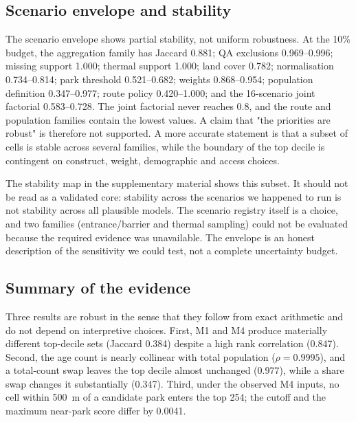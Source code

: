 \documentclass[times,twoside]{_Templates/MultiTargetManuscript}
\begin{document}


\subsection{Scenario envelope and stability}

The scenario envelope shows partial stability, not uniform robustness. At the
10\% budget, the aggregation family has Jaccard 0.881; QA exclusions 0.969--0.996;
missing support 1.000; thermal support 1.000; land cover 0.782; normalisation
0.734--0.814; park threshold 0.521--0.682; weights 0.868--0.954; population
definition 0.347--0.977; route policy 0.420--1.000; and the 16-scenario joint
factorial 0.583--0.728. The joint factorial never reaches 0.8, and the route and
population families contain the lowest values. A claim that "the priorities are
robust" is therefore not supported. A more accurate statement is that a subset
of cells is stable across several families, while the boundary of the top decile
is contingent on construct, weight, demographic and access choices.

The stability map in the supplementary material shows this subset. It should not
be read as a validated core: stability across the scenarios we happened to run
is not stability across all plausible models. The scenario registry itself is a
choice, and two families (entrance/barrier and thermal sampling) could not be
evaluated because the required evidence was unavailable. The envelope is an honest description of the sensitivity we
could test, not a complete uncertainty budget.



\subsection{Summary of the evidence}

Three results are robust in the sense that they follow from exact arithmetic and
do not depend on interpretive choices. First, M1 and M4 produce materially
different top-decile sets (Jaccard 0.384) despite a high rank correlation
(0.847). Second, the age count is nearly collinear with total population
($\rho=0.9995$), and a total-count swap leaves the top decile almost unchanged
(0.977), while a share swap changes it substantially (0.347). Third, under the
observed M4 inputs, no cell within 500~m of a candidate park enters the top 254;
the cutoff and the maximum near-park score differ by 0.0041.
\end{document}
